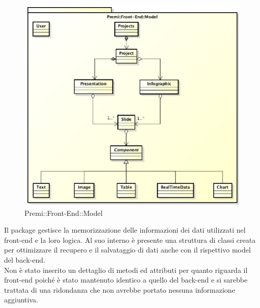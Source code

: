 \begin{figure}[h]
	\centering
	\includegraphics[width=0.7\linewidth]{img/premi_front_end_model}
	\caption[Premi::Front-End::Model]{Premi::Front-End::Model}
\end{figure}
Il package gestisce la memorizzazione delle informazioni dei dati utilizzati nel front-end e la loro logica. Al suo interno è presente una struttura di classi creata per ottimizzare il recupero e il salvataggio di dati anche con il rispettivo model del back-end.\\
Non è stato inserito un dettaglio di metodi ed attributi per quanto riguarda il front-end poiché è stato mantenuto identico a quello del back-end e si sarebbe trattata di una ridondanza che non avrebbe portato nessuna informazione aggiuntiva.